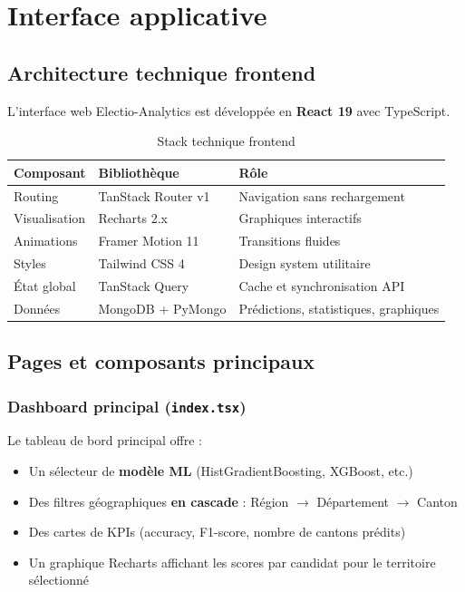 \chapter{Interface applicative}
\label{ch:ui}

\section{Architecture technique frontend}

L'interface web Electio-Analytics est développée en \textbf{React 19} avec TypeScript.

\begin{table}[H]
\centering
\caption{Stack technique frontend}
\label{tab:stack}
\begin{tabular}{lll}
\toprule
\textbf{Composant} & \textbf{Bibliothèque} & \textbf{Rôle} \\
\midrule
Routing          & TanStack Router v1   & Navigation sans rechargement \\
Visualisation    & Recharts 2.x         & Graphiques interactifs \\
Animations       & Framer Motion 11     & Transitions fluides \\
Styles           & Tailwind CSS 4       & Design system utilitaire \\
État global      & TanStack Query       & Cache et synchronisation API \\
Données          & MongoDB + PyMongo    & Prédictions, statistiques, graphiques \\
\bottomrule
\end{tabular}
\end{table}

\section{Pages et composants principaux}

\subsection{Dashboard principal (\texttt{index.tsx})}

Le tableau de bord principal offre :
\begin{itemize}
  \item Un sélecteur de \textbf{modèle ML} (HistGradientBoosting, XGBoost, etc.)
  \item Des filtres géographiques \textbf{en cascade} : Région $\rightarrow$ Département $\rightarrow$ Canton
  \item Des cartes de KPIs (accuracy, F1-score, nombre de cantons prédits)
  \item Un graphique Recharts affichant les scores par candidat pour le territoire sélectionné
\end{itemize}

